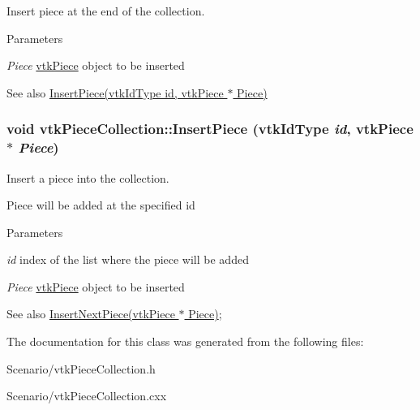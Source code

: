 Insert piece at the end of the collection. 


\begin{DoxyParams}{Parameters}
\item[{\em Piece}]\hyperlink{classvtkPiece}{vtkPiece} object to be inserted \end{DoxyParams}
\begin{DoxySeeAlso}{See also}
\hyperlink{classvtkPieceCollection_a8bd89cd54bd00572fbffc2c403e35cef}{InsertPiece(vtkIdType id, vtkPiece $\ast$ Piece)} 
\end{DoxySeeAlso}
\hypertarget{classvtkPieceCollection_a8bd89cd54bd00572fbffc2c403e35cef}{
\subsubsection[{InsertPiece}]{\setlength{\rightskip}{0pt plus 5cm}void vtkPieceCollection::InsertPiece (vtkIdType {\em id}, \/  {\bf vtkPiece} $\ast$ {\em Piece})}}
\label{classvtkPieceCollection_a8bd89cd54bd00572fbffc2c403e35cef}


Insert a piece into the collection. 

Piece will be added at the specified id 
\begin{DoxyParams}{Parameters}
\item[{\em id}]index of the list where the piece will be added \item[{\em Piece}]\hyperlink{classvtkPiece}{vtkPiece} object to be inserted \end{DoxyParams}
\begin{DoxySeeAlso}{See also}
\hyperlink{classvtkPieceCollection_a6f37b0535d1a952beaa969000f857f24}{InsertNextPiece(vtkPiece $\ast$ Piece)}; 
\end{DoxySeeAlso}


The documentation for this class was generated from the following files:\begin{DoxyCompactItemize}
\item 
Scenario/vtkPieceCollection.h\item 
Scenario/vtkPieceCollection.cxx\end{DoxyCompactItemize}
